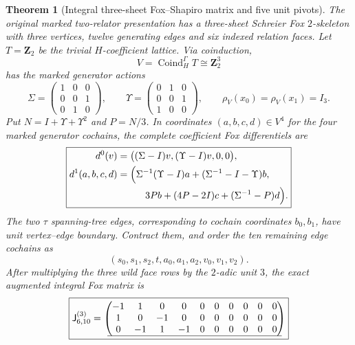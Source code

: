 \documentclass[11pt]{article}
\newtheorem{theorem}{Theorem}[section]
\theoremstyle{definition}
\begin{document}
\begin{theorem}[Integral three-sheet Fox--Shapiro matrix and five unit pivots]
\label{thm:dyadic-f133-cover-fox-shapiro-matrix}
The original
marked two-relator
presentation has a
three-sheet
Schreier Fox
$2$-skeleton
with three vertices,
twelve generating
edges and six
indexed relation
faces.  Let
$T=\mathbf Z_2$
be the trivial
$H$-coefficient
lattice.
Via
coinduction,
\[
V=\operatorname{Coind}_H^\Gamma T
\cong\mathbf Z_2^3
\]
has the marked
generator actions
\begin{equation}\label{eq:dyadic-f133-three-sheet-actions}
\boxed{
\Sigma=
\begin{pmatrix}
1&0&0\\0&0&1\\0&1&0
\end{pmatrix},
\qquad
\Upsilon=
\begin{pmatrix}
0&1&0\\0&0&1\\1&0&0
\end{pmatrix},
\qquad
\rho_V(x_0)=\rho_V(x_1)=I_3.
}
\end{equation}
Put $N=I+\Upsilon+\Upsilon^2$
and $P=N/3$.
In coordinates $(a,b,c,d)\in V^4$
for the four marked
generator cochains,
the complete
coefficient Fox
differentiels are
\begin{equation}\label{eq:dyadic-f133-coinduced-full-fox}
\boxed{
\begin{aligned}
d^0(v)
 &=\bigl((\Sigma-I)v,
       (\Upsilon-I)v,0,0\bigr),\\
d^1(a,b,c,d)
 &=\Bigl(
 \Sigma^{-1}(\Upsilon-I)a+
  (\Sigma^{-1}-I-\Upsilon)b,\\
 &\hspace{2.9em}
 3Pb+(4P-2I)c+
      (\Sigma^{-1}-P)d
 \Bigr).
\end{aligned}}
\end{equation}
The two $\tau$
spanning-tree edges,
corresponding to
cochain coordinates
$b_0,b_1$, have
unit vertex--edge
boundary.
Contract them,
and order the ten
remaining edge
cochains as
\[
(s_0,s_1,s_2,t,
a_0,a_1,a_2,v_0,v_1,v_2).
\]
After multiplying
the three wild
face rows by
the $2$-adic unit
$3$, the exact
augmented integral
Fox matrix is
\begin{equation}\label{eq:dyadic-f133-six-ten-fox-matrix}
\boxed{
\mathsf J^{(3)}_{6,10}=
\begin{pmatrix}
-1&1&0&0&0&0&0&0&0&0\\
1&0&-1&0&0&0&0&0&0&0\\
0&-1&1&-1&0&0&0&0&0&0\\ \hline

\end{pmatrix}}
\end{equation}
\end{theorem}
\end{document}
